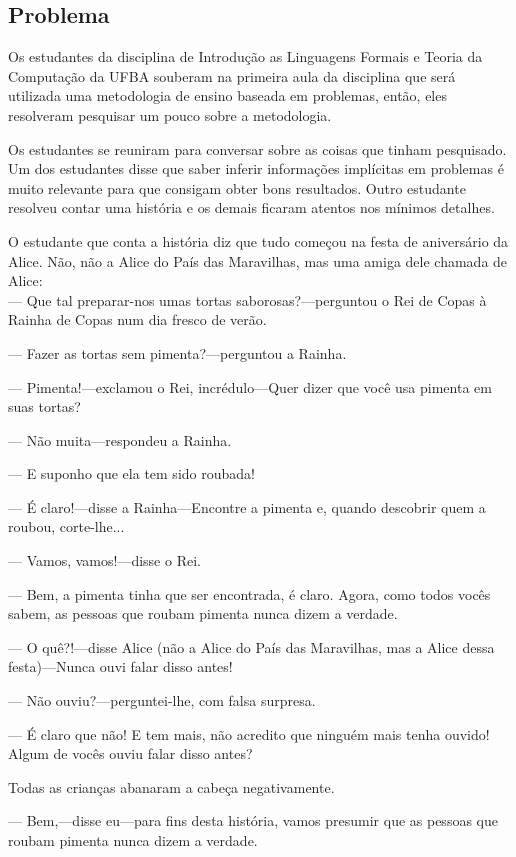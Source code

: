\subsection{Problema}
Os estudantes da disciplina de Introdução as Linguagens Formais e Teoria da Computação da UFBA
souberam na primeira aula da disciplina que será utilizada uma metodologia de ensino baseada
em problemas, então, eles resolveram pesquisar um pouco sobre a metodologia.

Os estudantes se reuniram para conversar sobre as coisas que tinham pesquisado.
Um dos estudantes disse que saber inferir informações implícitas em problemas é muito relevante
para que consigam obter bons resultados.
Outro estudante resolveu contar uma história e os demais ficaram atentos nos mínimos detalhes.

O estudante que conta a história diz que tudo começou na festa de aniversário da Alice.
Não, não a Alice do País das Maravilhas, mas uma amiga dele chamada de Alice:\\

--- Que tal preparar-nos umas tortas saborosas?---perguntou o Rei de Copas à Rainha de Copas num dia fresco de verão.

--- Fazer as tortas sem pimenta?---perguntou a Rainha.

--- Pimenta!---exclamou o Rei, incrédulo---Quer dizer que você usa pimenta em suas tortas?

--- Não muita---respondeu a Rainha.

--- E suponho que ela tem sido roubada!

--- É claro!---disse a Rainha---Encontre a pimenta e, quando descobrir quem a roubou, corte-lhe...

--- Vamos, vamos!---disse o Rei.

--- Bem, a pimenta tinha que ser encontrada, é claro. Agora, como todos vocês sabem, as pessoas que roubam pimenta nunca dizem a verdade.

--- O quê?!---disse Alice (não a Alice do País das Maravilhas, mas a Alice dessa festa)---Nunca ouvi falar disso antes!

--- Não ouviu?---perguntei-lhe, com falsa surpresa.

--- É claro que não! E tem mais, não acredito que ninguém mais tenha ouvido! Algum de vocês ouviu falar disso antes?

Todas as crianças abanaram a cabeça negativamente.

--- Bem,---disse eu---para fins desta história, vamos presumir que as pessoas que roubam pimenta nunca dizem a verdade.

